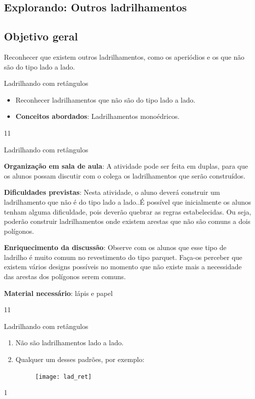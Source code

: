 \cleardoublepage
\def\currentcolor{session1}
\begin{texto}
{
\section{Explorando: Outros ladrilhamentos}
\subsection{Objetivo geral}
Reconhecer que existem outros ladrilhamentos, como os aperiódios e os que não são do tipo lado a lado.}
\end{texto}
\marginpar{\vspace{-\baselineskip}}
\begin{objectives}{Ladrilhando com retângulos}
{
	\begin{itemize}
	\item Reconhecer ladrilhamentos que não são do tipo lado a lado.
	\item \textbf{Conceitos abordados}: Ladrilhamentos monoédricos.
	\end{itemize}	
}{1}{1}
\end{objectives}
\marginpar{\vspace{-2\baselineskip}}
\begin{sugestions}{Ladrilhando com retângulos}
{
	\textbf{Organização em sala de aula}: A atividade pode ser feita em duplas, para que os alunos possam discutir com o colega os ladrilhamentos que serão construídos.

	\textbf{Dificuldades previstas}: Nesta atividade, o aluno deverá construir um ladrilhamento que não é do tipo lado a lado..É possível que inicialmente os alunos tenham alguma dificuldade, pois deverão quebrar as regras estabelecidas. Ou seja, poderão construir ladrilhamentos onde existem arestas que não são comuns a dois polígonos.

	\textbf{Enriquecimento da discussão}: Observe com os alunos que esse tipo de ladrilho é muito comum no revestimento do tipo parquet. Faça-os perceber que existem vários designs possíveis no momento que não existe mais a necessidade das arestas dos polígonos serem comuns. 

	\textbf{Material necessário}: lápis e papel

}{1}{1}
\end{sugestions}
\marginpar{\vspace{-\baselineskip}}
\begin{answer}{Ladrilhando com retângulos}
{
	\begin{enumerate}
	\item Não são ladrilhamentos lado a lado.
	\item Qualquer um desses padrões, por exemplo:
	\begin{figure}[H]
	\centering
	\texttt{[image: lad\_ret]}
	\end{figure}
	\end{enumerate}
}{1}
\end{answer}
